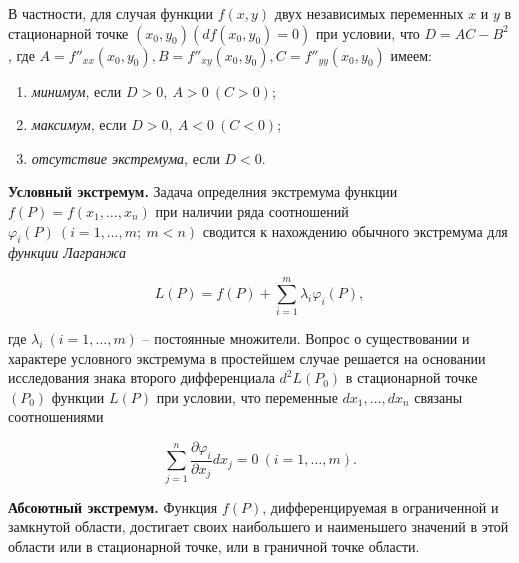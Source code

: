 В частности, для случая функции $f \left( x, y \right)$ двух независимых переменных $x$ и $y$ в стационарной точке $\left( x_{0}, y_{0} \right) \left( d f \left( x_{0}, y_{0} \right) =0 \right)$ при условии, что $D = A C - B^{2}$, где $A = f''_{xx} \left( x_{0}, y_{0} \right), B = f''_{xy} \left( x_{0}, y_{0} \right), C = f''_{yy} \left( x_{0}, y_{0} \right)$ имеем:

\begin{enumerate}
	\item \textit{минимум}, если $D > 0, \: A > 0 \: \left( C > 0 \right)$;
	\item \textit{максимум}, если $D > 0, \: A < 0 \: \left( C < 0 \right)$;
	\item \textit{отсутствие экстремума}, если $D < 0$.
\end{enumerate}

\textbf{Условный экстремум.} Задача определния экстремума функции $f \left( P \right) = f \left( x_{1}, \ldots, x_{n} \right)$ при наличии ряда соотношений $\varphi_{i} \left( P \right) \: \left( i = 1, \ldots, m; \: m < n \right)$ сводится к нахождению обычного экстремума для \textit{функции Лагранжа}

\[
L \left( P \right) = f \left( P \right) + \sum^{m}_{i = 1} \lambda_{i} \varphi_{i} \left( P \right),
\]

где $\lambda_{i} \: \left( i = 1, \ldots, m \right)$ -- постоянные множители. Вопрос о существовании и характере условного экстремума в простейшем случае решается на основании исследования знака второго дифференциала $d^{2} L \left( P_{0} \right)$ в стационарной точке $\left( P_{0} \right)$ функции $L \left( P \right)$ при условии, что переменные $d x_{1}, \ldots, d x_{n}$ связаны соотношениями

\[
\sum^{n}_{j = 1} \frac{\partial \varphi_{i}}{\partial x_{j}} d x_{j} = 0 \: \left( i = 1, \ldots, m \right).
\]

\textbf{Абсоютный экстремум.} Функция $f \left( P \right)$, дифференцируемая в ограниченной и замкнутой области, достигает своих наибольшего и наименьшего значений в этой области или в стационарной точке, или в граничной точке области.


